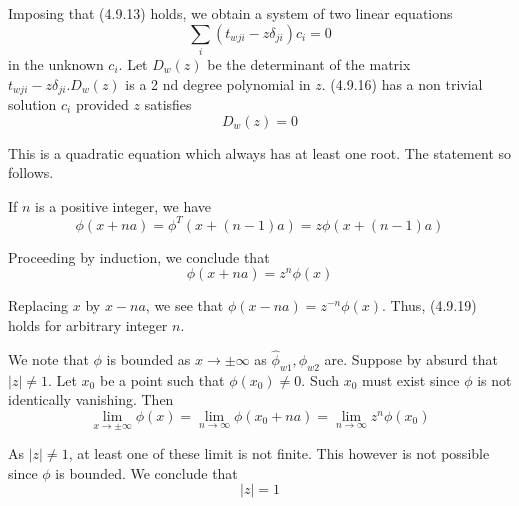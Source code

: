 \documentclass{article}
\begin{document}
Imposing that (4.9.13) holds, we obtain a system of two linear equations
$$
\begin{equation*}
\sum_{i}\left(t_{w j i}-z \delta_{j i}\right) c_{i}=0 \tag{4.9.16}
\end{equation*}
$$
in the unknown $c_{i}$. Let $D_{w}(z)$ be the determinant of the matrix $t_{w j i}-z \delta_{j i} . D_{w}(z)$ is a 2 nd degree polynomial in $z$. (4.9.16) has a non trivial solution $c_{i}$ provided $z$ satisfies
$$
\begin{equation*}
D_{w}(z)=0 \tag{4.9.17}
\end{equation*}
$$

This is a quadratic equation which always has at least one root. The statement so follows.

If $n$ is a positive integer, we have
$$
\begin{equation*}
\phi(x+n a)=\phi^{T}(x+(n-1) a)=z \phi(x+(n-1) a) \tag{4.9.18}
\end{equation*}
$$

Proceeding by induction, we conclude that
$$
\begin{equation*}
\phi(x+n a)=z^{n} \phi(x) \tag{4.9.19}
\end{equation*}
$$

Replacing $x$ by $x-n a$, we see that $\phi(x-n a)=z^{-n} \phi(x)$. Thus, (4.9.19) holds for arbitrary integer $n$.

We note that $\phi$ is bounded as $x \rightarrow \pm \infty$ as $\hat{\phi}_{w 1}, \hat{\phi}_{w 2}$ are. Suppose by absurd that $|z| \neq 1$. Let $x_{0}$ be a point such that $\phi\left(x_{0}\right) \neq 0$. Such $x_{0}$ must exist since $\phi$ is not identically vanishing. Then
$$
\begin{equation*}
\lim _{x \rightarrow \pm \infty} \phi(x)=\lim _{n \rightarrow \infty} \phi\left(x_{0}+n a\right)=\lim _{n \rightarrow \infty} z^{n} \phi\left(x_{0}\right) \tag{4.9.20}
\end{equation*}
$$

As $|z| \neq 1$, at least one of these limit is not finite. This however is not possible since $\phi$ is bounded. We conclude that
$$
\begin{equation*}
|z|=1 \tag{4.9.21}
\end{equation*}
$$
\end{document}
